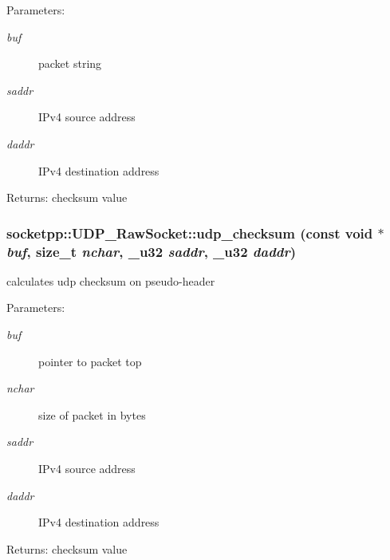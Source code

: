 \begin{Desc}
\item[Parameters:]
\begin{description}
\item[{\em buf}]packet string \item[{\em saddr}]IPv4 source address \item[{\em daddr}]IPv4 destination address \end{description}
\end{Desc}
\begin{Desc}
\item[Returns:]checksum value \end{Desc}
\hypertarget{classsocketpp_1_1UDP__RawSocket_fdc782d0436fd9c6d24520034d445063}{
\subsubsection[{udp\_\-checksum}]{ socketpp::UDP\_\-RawSocket::udp\_\-checksum (const void $\ast$ {\em buf}, \/  size\_\-t {\em nchar}, \/  {\bf \_\-u32} {\em saddr}, \/  {\bf \_\-u32} {\em daddr})}}
\label{classsocketpp_1_1UDP__RawSocket_fdc782d0436fd9c6d24520034d445063}


calculates udp checksum on pseudo-header 

\begin{Desc}
\item[Parameters:]
\begin{description}
\item[{\em buf}]pointer to packet top \item[{\em nchar}]size of packet in bytes \item[{\em saddr}]IPv4 source address \item[{\em daddr}]IPv4 destination address \end{description}
\end{Desc}
\begin{Desc}
\item[Returns:]checksum value \end{Desc}


